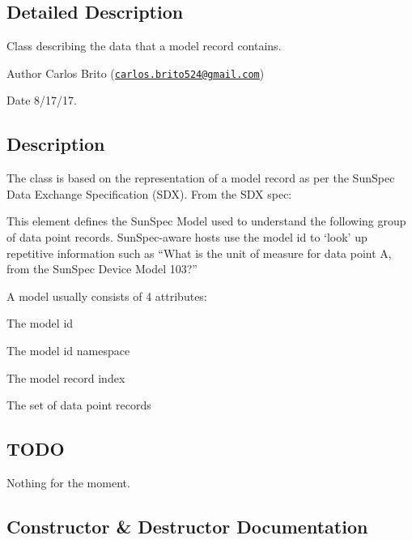 \subsection{Detailed Description}
Class describing the data that a model record contains. 

\begin{DoxyAuthor}{Author}
Carlos Brito (\href{mailto:carlos.brito524@gmail.com}{\tt carlos.\+brito524@gmail.\+com}) 
\end{DoxyAuthor}
\begin{DoxyDate}{Date}
8/17/17.
\end{DoxyDate}
\subsection*{Description}

The class is based on the representation of a model record as per the Sun\+Spec Data Exchange Specification (S\+DX). From the S\+DX spec\+:


\begin{DoxyCode}
This element defines the SunSpec Model used to understand the following group
of data point records. SunSpec-aware hosts use the model \textcolor{keywordtype}{id} to ‘look’
up repetitive information such as “What is the unit of measure \textcolor{keywordflow}{for} data point A,
from the SunSpec Device Model 103?”
\end{DoxyCode}


A model usually consists of 4 attributes\+:
\begin{DoxyItemize}
\item The model id
\item The model id namespace
\item The model record index
\item The set of data point records
\end{DoxyItemize}

\subsection*{T\+O\+DO}

Nothing for the moment. 

\subsection{Constructor \& Destructor Documentation}
\mbox{\label{structsunspec_1_1data_1_1_model_data_a53328bff6dd8917ffa55c9d762fef749}} 

